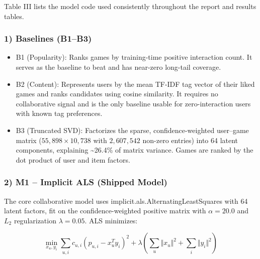 \documentclass[conference]{IEEEtran}
\begin{document}
Table III lists the model code used consistently throughout the report and results tables.

\subsubsection*{1) Baselines (B1--B3)}

\begin{itemize}

\item B1 (Popularity): Ranks games by training-time positive interaction count. It serves as the baseline to beat and has near-zero long-tail coverage.

\end{itemize}

\begin{itemize}

\item B2 (Content): Represents users by the mean TF-IDF tag vector of their liked games and ranks candidates using cosine similarity. It requires no collaborative signal and is the only baseline usable for zero-interaction users with known tag preferences.

\end{itemize}

\begin{itemize}

\item B3 (Truncated SVD): Factorizes the sparse, confidence-weighted user--game matrix ($55,898 \times 10,738$ with $2,607,542$ non-zero entries) into 64 latent components, explaining \textasciitilde{}26.4\% of matrix variance. Games are ranked by the dot product of user and item factors.

\end{itemize}

\subsubsection*{2) M1 -- Implicit ALS (Shipped Model)}

The core collaborative model uses implicit.als.AlternatingLeastSquares with 64 latent factors, fit on the confidence-weighted positive matrix with $\alpha = 20.0$ and $L_2$ regularization $\lambda = 0.05$. ALS minimizes:

\begin{equation}
\min_{x_u, y_i} \sum_{u,i} c_{u,i} (p_{u,i} - x_u^T y_i)^2 + \lambda \left( \sum_u \Vert x_u \Vert^2 + \sum_i \Vert y_i \Vert^2 \right)
\end{equation}
\end{document}
